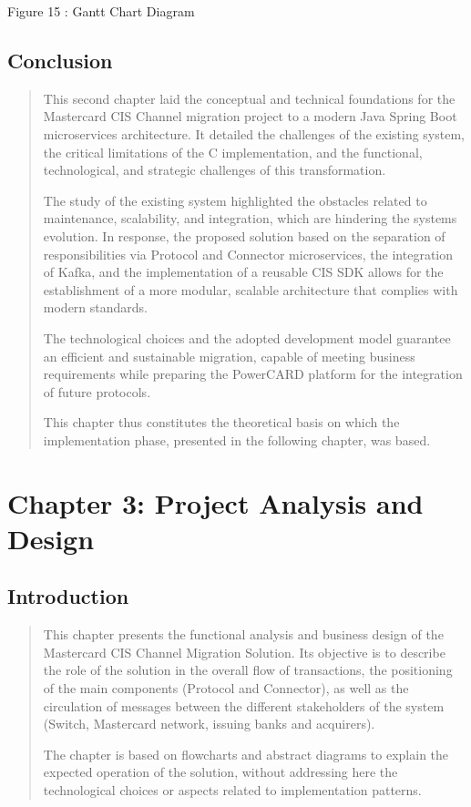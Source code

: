 \documentclass[12pt,a4paper]{report}
\begin{document}
\protect\hypertarget{_Toc201954491}{}{}Figure 15 : Gantt Chart Diagram

\hypertarget{conclusion-1}{%
\subsection{\texorpdfstring{\textbf{Conclusion}}{Conclusion}}\label{conclusion-1}}

\begin{quote}
This second chapter laid the conceptual and technical foundations for
the Mastercard CIS Channel migration project to a modern Java Spring
Boot microservices architecture. It detailed the challenges of the
existing system, the critical limitations of the C implementation, and
the functional, technological, and strategic challenges of this
transformation.

The study of the existing system highlighted the obstacles related to
maintenance, scalability, and integration, which are hindering the
system\textquotesingle s evolution. In response, the proposed solution
based on the separation of responsibilities via Protocol and Connector
microservices, the integration of Kafka, and the implementation of a
reusable CIS SDK allows for the establishment of a more modular,
scalable architecture that complies with modern standards.

The technological choices and the adopted development model guarantee an
efficient and sustainable migration, capable of meeting business
requirements while preparing the PowerCARD platform for the integration
of future protocols.

This chapter thus constitutes the theoretical basis on which the
implementation phase, presented in the following chapter, was based.
\end{quote}

\hypertarget{chapter-3-project-analysis-and-design}{%
\section{Chapter 3: Project Analysis and
Design}\label{chapter-3-project-analysis-and-design}}

\hypertarget{introduction-1}{%
\subsection{\texorpdfstring{\textbf{Introduction}}{Introduction}}\label{introduction-1}}

\begin{quote}
This chapter presents the functional analysis and business design of the
Mastercard CIS Channel Migration Solution. Its objective is to describe
the role of the solution in the overall flow of transactions, the
positioning of the main components (Protocol and Connector), as well as
the circulation of messages between the different stakeholders of the
system (Switch, Mastercard network, issuing banks and acquirers).

The chapter is based on flowcharts and abstract diagrams to explain the
expected operation of the solution, without addressing here the
technological choices or aspects related to implementation patterns.
\end{quote}
\end{document}
